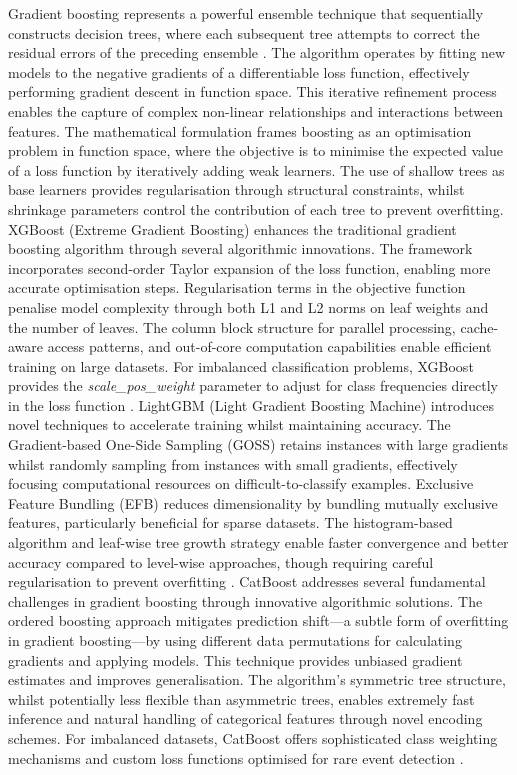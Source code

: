 Gradient  boosting represents a powerful ensemble technique that sequentially constructs decision trees, where each subsequent tree attempts to correct the residual errors of the preceding ensemble \citep{Bentéjac_2021}. The algorithm operates by fitting new models to the negative gradients of a differentiable loss function, effectively performing gradient descent in function space. This iterative refinement process enables the capture of complex non-linear relationships and interactions between features. The mathematical formulation frames boosting as an optimisation problem in function space, where the objective is to minimise the expected value of a loss function by iteratively adding weak learners. The use of shallow trees as base learners provides regularisation through structural constraints, whilst shrinkage parameters control the contribution of each tree to prevent overfitting. XGBoost (Extreme Gradient Boosting) enhances the traditional gradient boosting algorithm through several algorithmic innovations. The framework incorporates second-order Taylor expansion of the loss function, enabling more accurate optimisation steps. Regularisation terms in the objective function penalise model complexity through both L1 and L2 norms on leaf weights and the number of leaves. The column block structure for parallel processing, cache-aware access patterns, and out-of-core computation capabilities enable efficient training on large datasets. For imbalanced classification problems, XGBoost provides the \textit{scale\_pos\_weight} parameter to adjust for class frequencies directly in the loss function \citep{Chen_2016}. LightGBM (Light Gradient Boosting Machine) introduces novel techniques to accelerate training whilst maintaining accuracy. The Gradient-based One-Side Sampling (GOSS) retains instances with large gradients whilst randomly sampling from instances with small gradients, effectively focusing computational resources on difficult-to-classify examples. Exclusive Feature Bundling (EFB) reduces dimensionality by bundling mutually exclusive features, particularly beneficial for sparse datasets. The histogram-based algorithm and leaf-wise tree growth strategy enable faster convergence and better accuracy compared to level-wise approaches, though requiring careful regularisation to prevent overfitting \citep{Ke_2017}. CatBoost addresses several fundamental challenges in gradient boosting through innovative algorithmic solutions. The ordered boosting approach mitigates prediction shift—a subtle form of overfitting in gradient boosting—by using different data permutations for calculating gradients and applying models. This technique provides unbiased gradient estimates and improves generalisation. The algorithm's symmetric tree structure, whilst potentially less flexible than asymmetric trees, enables extremely fast inference and natural handling of categorical features through novel encoding schemes. For imbalanced datasets, CatBoost offers sophisticated class weighting mechanisms and custom loss functions optimised for rare event detection \citep{Prokhorenkova_2018}.

